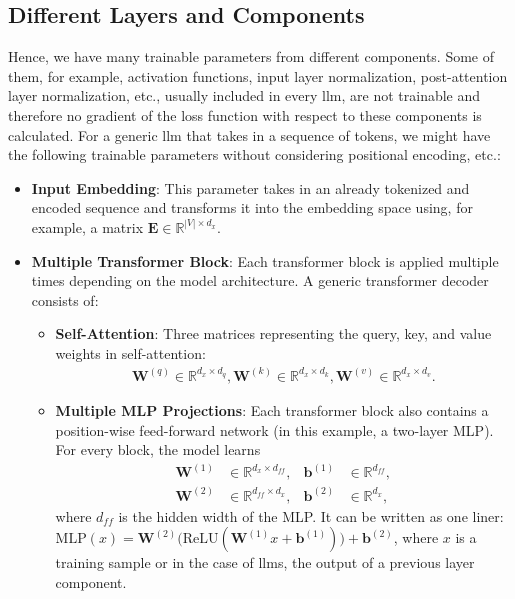 \subsection{Different Layers and Components}\label{ssec:different_layers_and_components}
Hence, we have many trainable parameters from different components. Some of them, for example, activation functions, input layer normalization, post-attention layer normalization, etc., usually included in every \acrlong{llm}, are not trainable and therefore no gradient of the loss function with respect to these components is calculated. For a generic \acrshort{llm} that takes in a sequence of tokens, we might have the following trainable parameters without considering positional encoding, etc.:
\begin{itemize}
    \item \textbf{Input Embedding}: This parameter takes in an already tokenized and encoded sequence and transforms it into the embedding space using, for example, a matrix $\mathbf{E} \in \mathbb{R}^{|V| \times d_x}$. 
    
    \item \textbf{Multiple Transformer Block}:
    Each transformer block is applied multiple times depending on the model architecture. A generic transformer decoder consists of:
    \begin{itemize}
        \item \textbf{Self-Attention}: Three matrices representing the query, key, and value weights in self-attention:
            \begin{align*}
                  \mathbf{W}^{(q)} \in \mathbb{R}^{d_x \times d_q},  
                  \mathbf{W}^{(k)} \in \mathbb{R}^{d_x \times d_k},  
                  \mathbf{W}^{(v)} \in \mathbb{R}^{d_x \times d_v}.
            \end{align*}\cite{dl4nlp}
        \item \textbf{Multiple MLP Projections}: Each transformer block also contains a position-wise feed-forward network (in this example, a two-layer MLP). For every block, the model learns
            \begin{align*}
              \mathbf{W}^{(1)} &\in \mathbb{R}^{d_x \times d_{ff}}, & \mathbf{b}^{(1)} &\in \mathbb{R}^{d_{ff}},\\
              \mathbf{W}^{(2)} &\in \mathbb{R}^{d_{ff} \times d_x}, & \mathbf{b}^{(2)} &\in \mathbb{R}^{d_x},
            \end{align*}
              where $d_{ff}$ is the hidden width of the MLP. It can be written as one liner: $\text{MLP}(x)=\mathbf{W}^{(2)}\bigl(\text{ReLU}(\mathbf{W}^{(1)}x+\mathbf{b}^{(1)})\bigr)+\mathbf{b}^{(2)}$, where $x$ is a training sample or in the case of \acrlong{llm}s, the output of a previous layer component.
    \end{itemize}
    

\end{itemize}
